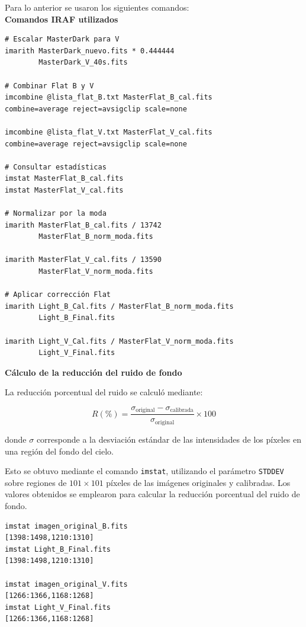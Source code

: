 \documentclass[10pt,a4paper,twocolumn]{article}
\begin{document}
Para lo anterior se usaron los siguientes comandos:\\

\noindent\textbf{Comandos IRAF utilizados}

{\footnotesize
\begin{verbatim}
# Escalar MasterDark para V
imarith MasterDark_nuevo.fits * 0.444444
        MasterDark_V_40s.fits

# Combinar Flat B y V
imcombine @lista_flat_B.txt MasterFlat_B_cal.fits
combine=average reject=avsigclip scale=none

imcombine @lista_flat_V.txt MasterFlat_V_cal.fits
combine=average reject=avsigclip scale=none

# Consultar estadísticas
imstat MasterFlat_B_cal.fits
imstat MasterFlat_V_cal.fits

# Normalizar por la moda
imarith MasterFlat_B_cal.fits / 13742
        MasterFlat_B_norm_moda.fits

imarith MasterFlat_V_cal.fits / 13590
        MasterFlat_V_norm_moda.fits

# Aplicar corrección Flat
imarith Light_B_Cal.fits / MasterFlat_B_norm_moda.fits
        Light_B_Final.fits

imarith Light_V_Cal.fits / MasterFlat_V_norm_moda.fits
        Light_V_Final.fits
\end{verbatim}
}

\noindent\textbf{Cálculo de la reducción del ruido de fondo}

La reducción porcentual del ruido se calculó mediante:

\[
R(\%)=
\frac{\sigma_{\mathrm{original}}-\sigma_{\mathrm{calibrada}}}
{\sigma_{\mathrm{original}}}\times 100
\]

donde $\sigma$ corresponde a la desviación estándar de las intensidades
de los píxeles en una región del fondo del cielo.


Esto se obtuvo mediante el comando
\texttt{imstat}, utilizando el parámetro \texttt{STDDEV} sobre regiones
de $101\times101$ píxeles de las imágenes originales y calibradas.
Los valores obtenidos se emplearon para calcular la reducción porcentual
del ruido de fondo.

{\scriptsize
\begin{verbatim}
imstat imagen_original_B.fits
[1398:1498,1210:1310]
imstat Light_B_Final.fits
[1398:1498,1210:1310]

imstat imagen_original_V.fits
[1266:1366,1168:1268]
imstat Light_V_Final.fits
[1266:1366,1168:1268]
\end{verbatim}
}
\end{document}
